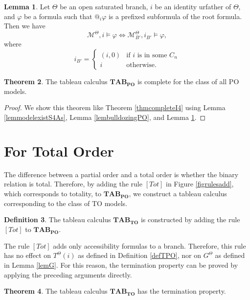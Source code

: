 \documentclass{article}
\theoremstyle{definition}
\newtheorem{definition}{Definition}[section]
\newtheorem{lemma}[definition]{Lemma}
\newtheorem{theorem}[definition]{Theorem}
\newcommand{\Kmodel}{\mathcal{M}}
\newcommand{\total}{\mathit{Tot}}
\newcommand{\tableauPO}{\mathbf{TAB}_{\textbf{PO}}}
\newcommand{\tableauTO}{\mathbf{TAB}_{\textbf{TO}}}
\begin{document}
\begin{lemma}
    Let $\Theta$ be an open saturated branch, $i$ be an identity urfather of $\Theta$, and $\varphi$ be a formula such that $@_i \varphi$ is a prefixed subformula of the root formula. Then we have
    \[
        \Kmodel^\Theta, i \models \varphi \iff \Kmodel^\Theta_{B'}, i_{B'} \models \varphi ,
    \]
    where
    \[
        i_{B'} = 
        \begin{cases}
            (i, 0) &\text{if } i \text{ is in some } C_n \\
            i &\text{otherwise}.
        \end{cases}
    \]
    \label{lembulldozingpreservePO}
\end{lemma}

\begin{theorem}
    The tableau calculus $\tableauPO$ is complete for the class of all PO models.
    \label{thmcompleteSPAs}
\end{theorem}
\begin{proof}
    We show this theorem like Theorem \ref{thmcompleteI4} using Lemma \ref{lemmodelexistS4As}, Lemma \ref{lembulldozingPO}, and Lemma \ref{lembulldozingpreservePO}.
\end{proof}

\section{For Total Order}
\label{sec:TO}

The difference between a partial order and a total order is whether the binary relation is total. Therefore, by adding the rule $[\total]$ in Figure \ref{figrulesadd}, which corresponds to totality, to $\tableauPO$, we construct a tableau calculus corresponding to the class of TO models.

\begin{definition}
    The tableau calculus $\tableauTO$ is constructed by adding the rule $[\total]$ to $\tableauPO$.
\end{definition}

The rule $[\total]$ adds only accessibility formulas to a branch. Therefore, this rule has no effect on $T^\Theta(i)$ as defined in Definition \ref{defTPO}, nor on $G^\Theta$ as defined in Lemma \ref{lemG}. For this reason, the termination property can be proved by applying the preceding arguments directly.

\begin{theorem}
    The tableau calculus $\tableauTO$ has the termination property.
    \label{thm:termTO}
\end{theorem}
\end{document}
